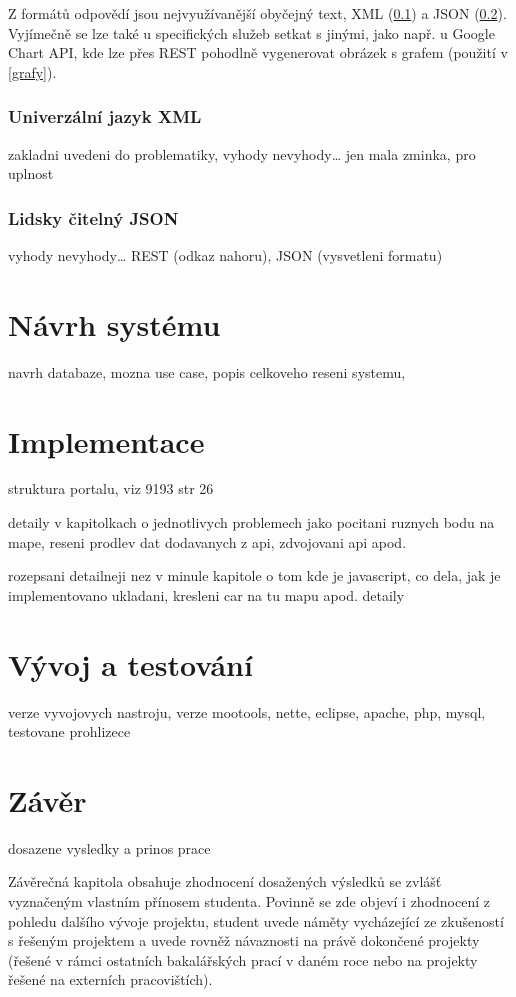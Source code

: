 Z formátů odpovědí jsou nejvyužívanější obyčejný text, XML (\ref{xml})
a JSON (\ref{json}). Vyjímečně se lze také u specifických služeb
setkat s jinými, jako např. u Google Chart API, kde lze přes REST
pohodlně vygenerovat obrázek s grafem (použití v \ref{grafy}).

\subsection{Univerzální jazyk XML}\label{xml}
zakladni uvedeni do problematiky, vyhody nevyhody\ldots
jen mala zminka, pro uplnost
\subsection{Lidsky čitelný JSON}\label{json}
vyhody nevyhody\ldots
REST (odkaz nahoru), JSON (vysvetleni formatu)

\chapter{Návrh systému}
navrh databaze, mozna use case, popis celkoveho reseni systemu,

\chapter{Implementace}
struktura portalu, viz 9193 str 26

detaily v kapitolkach o jednotlivych problemech jako pocitani ruznych bodu na mape, reseni prodlev dat
dodavanych z api, zdvojovani api apod.

rozepsani detailneji nez v minule kapitole o tom kde je javascript,
co dela, jak je implementovano ukladani, kresleni car na tu mapu
apod. detaily

\chapter{Vývoj a testování}
verze vyvojovych nastroju, verze mootools, nette, eclipse, apache,
php, mysql, testovane prohlizece

\chapter*{Závěr}
dosazene vysledky a prinos prace

Závěrečná kapitola obsahuje zhodnocení dosažených výsledků se zvlášť
vyznačeným vlastním přínosem studenta. Povinně se zde objeví i
zhodnocení z pohledu dalšího vývoje projektu, student uvede náměty
vycházející ze zkušeností s řešeným projektem a uvede rovněž
návaznosti na právě dokončené projekty (řešené v rámci ostatních
bakalářských prací v daném roce nebo na projekty řešené na externích
pracovištích).
